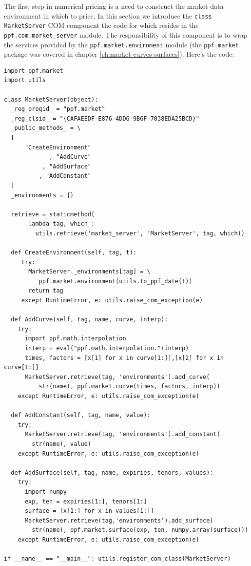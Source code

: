 The first step in numerical pricing is a need to construct the market
data environment in which to price. In this section we introduce the
\verb|class MarketServer| COM component the code for which resides in
the \verb|ppf.com.market_server| module. The responsibility of this
component is to wrap the services provided by the
\verb|ppf.market.enviroment| module (the \verb|ppf.market| package was
covered in chapter \ref{ch:market-curves-surfaces}). Here's the code:
\begin{verbatim}
import ppf.market
import utils

class MarketServer(object):
  _reg_progid_ = "ppf.market"
  _reg_clsid_ = "{CAFAEEDF-E876-4DD6-9B6F-7038EDA25BCD}"
  _public_methods_ = \
  [
      "CreateEnvironment"
             , "AddCurve"
           , "AddSurface"
          , "AddConstant"
  ]
  _environments = {}

  retrieve = staticmethod(
       lambda tag, which :
         utils.retrieve('market_server', 'MarketServer', tag, which))

  def CreateEnvironment(self, tag, t):
     try:
       MarketServer._environments[tag] = \
          ppf.market.environment(utils.to_ppf_date(t))
       return tag
     except RuntimeError, e: utils.raise_com_exception(e)

  def AddCurve(self, tag, name, curve, interp):
    try:
      import ppf.math.interpolation
      interp = eval("ppf.math.interpolation."+interp)
      times, factors = [x[1] for x in curve[1:]],[x[2] for x in curve[1:]]
      MarketServer.retrieve(tag, 'environments').add_curve(
          str(name), ppf.market.curve(times, factors, interp))
    except RuntimeError, e: utils.raise_com_exception(e)

  def AddConstant(self, tag, name, value):
    try:
      MarketServer.retrieve(tag, 'environments').add_constant(
        str(name), value)
    except RuntimeError, e: utils.raise_com_exception(e)

  def AddSurface(self, tag, name, expiries, tenors, values):
    try:
      import numpy
      exp, ten = expiries[1:], tenors[1:]
      surface = [x[1:] for x in values[1:]]
      MarketServer.retrieve(tag,'environments').add_surface(
        str(name), ppf.market.surface(exp, ten, numpy.array(surface)))
    except RuntimeError, e: utils.raise_com_exception(e)

if __name__ == "__main__": utils.register_com_class(MarketServer)
\end{verbatim}


